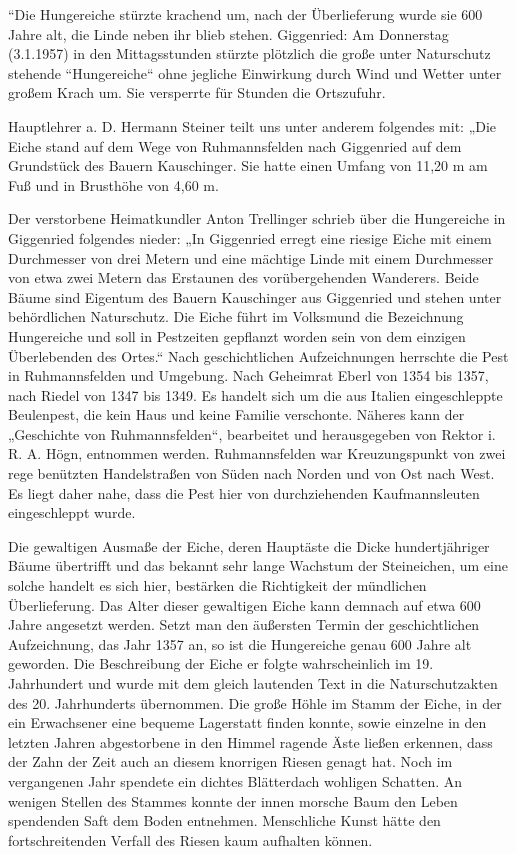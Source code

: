 \documentclass{book}
\begin{document}
“Die Hungereiche stürzte krachend um, nach der Überlieferung wurde sie 600 Jahre
alt, die Linde neben ihr blieb stehen. Giggenried: Am Donnerstag (3.1.1957) in
den Mittagsstunden stürzte plötzlich die große unter Naturschutz stehende
“Hungereiche“ ohne jegliche Einwirkung durch Wind und Wetter unter großem Krach
um. Sie versperrte für Stunden die Ortszufuhr.

Hauptlehrer a. D. Hermann Steiner teilt uns unter anderem folgendes mit: „Die
Eiche stand auf dem Wege von Ruhmannsfelden nach Giggenried auf dem Grundstück
des Bauern Kauschinger. Sie hatte einen Umfang von 11,20 m am Fuß und in
Brusthöhe von 4,60 m.

Der verstorbene Heimatkundler Anton Trellinger schrieb über die Hungereiche in
Giggenried folgendes nieder: „In Giggenried erregt eine riesige Eiche mit einem
Durchmesser von drei Metern und eine mächtige Linde mit einem Durchmesser von
etwa zwei Metern das Erstaunen des vorübergehenden Wanderers. Beide Bäume sind
Eigentum des Bauern Kauschinger aus Giggenried und stehen unter behördlichen
Naturschutz. Die Eiche führt im Volksmund die Bezeichnung Hungereiche und soll
in Pestzeiten gepflanzt worden sein von dem einzigen Überlebenden des Ortes.“
Nach geschichtlichen Aufzeichnungen herrschte die Pest in Ruhmannsfelden und
Umgebung. Nach Geheimrat Eberl von 1354 bis 1357, nach Riedel     von 1347 bis
1349. Es handelt sich um die aus Italien eingeschleppte Beulenpest, die kein
Haus und keine Familie verschonte. Näheres kann der „Geschichte von
Ruhmannsfelden“, bearbeitet und herausgegeben von Rektor i. R. A. Högn,
entnommen werden. Ruhmannsfelden war Kreuzungspunkt von zwei rege benützten
Handelstraßen von Süden nach Norden und von Ost nach West. Es liegt daher nahe,
dass die Pest hier von durchziehenden Kaufmannsleuten eingeschleppt wurde.

Die gewaltigen Ausmaße der Eiche, deren Hauptäste die Dicke hundertjähriger
Bäume übertrifft und das bekannt sehr lange Wachstum der Steineichen, um eine
solche handelt es sich hier, bestärken die Richtigkeit der mündlichen
Überlieferung. Das Alter dieser gewaltigen Eiche kann demnach auf etwa 600 Jahre
angesetzt werden. Setzt man den äußersten Termin der geschichtlichen
Aufzeichnung, das Jahr 1357 an, so ist die Hungereiche genau 600 Jahre alt
geworden. Die Beschreibung der Eiche er folgte wahrscheinlich im 19. Jahrhundert
und wurde mit dem gleich lautenden Text in die Naturschutzakten des 20.
Jahrhunderts übernommen. Die große Höhle im Stamm der Eiche, in der ein
Erwachsener eine bequeme Lagerstatt finden konnte, sowie einzelne in den letzten
Jahren abgestorbene in den Himmel ragende Äste ließen erkennen, dass der Zahn
der Zeit auch an diesem knorrigen Riesen genagt hat. Noch im vergangenen Jahr
spendete ein dichtes Blätterdach wohligen Schatten. An wenigen Stellen des
Stammes konnte der innen morsche Baum den Leben spendenden Saft dem Boden
entnehmen. Menschliche Kunst hätte den fortschreitenden Verfall des Riesen kaum
aufhalten können.
\end{document}
